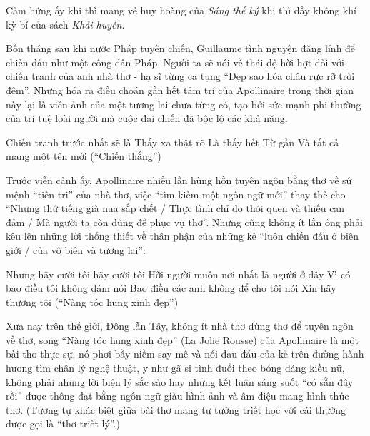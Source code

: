 \documentclass[../main.tex]{subfiles}
\begin{document}
\begin{multicols}{2}
\begin{blockquote}
\end{blockquote}
 
Cảm hứng ấy khi thì mang vẻ huy hoàng của \textit{Sáng thế ký} khi thì đầy không khí kỳ bí của sách \textit{Khải huyền}. 
  
Bốn tháng sau khi nước Pháp tuyên chiến, Guillaume tình nguyện đăng lính để chiến đấu như một công dân Pháp. Người ta sẽ nói về thái độ hời hợt đối với chiến tranh của anh nhà thơ - hạ sĩ từng ca tụng “Đẹp sao hỏa châu rực rỡ trời đêm”. Nhưng hóa ra điều choán gần hết tâm trí của Apollinaire trong thời gian này lại là viễn ảnh của một tương lai chưa từng có, tạo bởi sức mạnh phi thường của trí tuệ loài người mà cuộc đại chiến đã bộc lộ các khả năng. 
\begin{blockquote}
        
Chiến tranh trước nhất sẽ là         
Thấy xa thật rõ         
Là thấy hết         
Từ gần         
Và tất cả mang một tên mới        
(“Chiến thắng”) 

\end{blockquote}
 
Trước viễn cảnh ấy, Apollinaire nhiều lần hùng hồn tuyên ngôn bằng thơ về sứ mệnh “tiên tri” của nhà thơ, việc “tìm kiếm một ngôn ngữ mới” thay thế cho “Những thứ tiếng già nua sắp chết / Thực tình chỉ do thói quen và thiếu can đảm / Mà người ta còn dùng để phục vụ thơ”. Nhưng cũng không ít lần ông phải kêu lên những lời thống thiết về thân phận của những kẻ “luôn chiến đấu ở biên giới / của vô biên và tương lai”: 
\begin{blockquote}
        
Nhưng hãy cười tôi hãy cười tôi        
Hỡi người muôn nơi nhất là người ở đây         
Vì có bao điều tôi không dám nói         
Bao điều các anh không để cho tôi nói         
Xin hãy thương tôi        
(“Nàng tóc hung xinh đẹp”) 

\end{blockquote}
 
Xưa nay trên thế giới, Đông lẫn Tây, không ít nhà thơ dùng thơ để tuyên ngôn về thơ, song “Nàng tóc hung xinh đẹp” (La Jolie Rousse) của Apollinaire là một bài thơ thực sự, nó phơi bầy niềm say mê và nỗi đau đáu của kẻ trên đường hành hương tìm chân lý nghệ thuật, y như gã si tình đuổi theo bóng dáng kiều nữ, không phải những lời biện lý sắc sảo hay những kết luận sáng suốt “có sẵn đây rồi” được thông đạt bằng ngôn ngữ giàu hình ảnh và âm điệu mang hình thức thơ. (Tương tự khác biệt giữa bài thơ mang tư tưởng triết học với cái thường được gọi là “thơ triết lý”.) 
 

\end{multicols}
\end{document}
